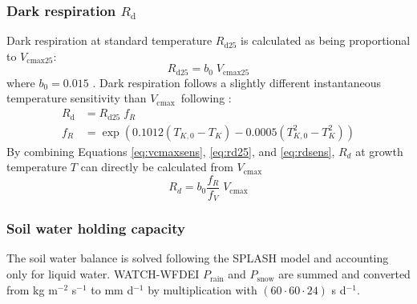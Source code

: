 \documentclass{myreport}
\newcommand{\vcmax}{$V_{\text{cmax}}$}
\begin{document}
\subsubsection{Dark respiration $R_{\mathrm{d}}$}

Dark respiration at standard temperature $R_{\mathrm{d25}}$ is calculated as being proportional to $V_{\mathrm{cmax25}}$:
\begin{equation}
\label{eq:rd25}
    R_{\mathrm{d25}} = b_0 \; V_{\mathrm{cmax25}}
\end{equation}
where $b_0 = 0.015$ \citep{atkin15}. Dark respiration follows a slightly different instantaneous temperature sensitivity than \vcmax\ following \cite{heskel16}:
\begin{align}
\label{eq:rdsens}
    R_{\mathrm{d}} &=  R_{\mathrm{d25}}\; f_R  \\
    f_R &= \exp \left(  0.1012(T_{K,0}-T_K) - 0.0005(T_{K,0}^2-T_K^2) \right) 
\end{align}
By combining Equations \ref{eq:vcmaxsens}, \ref{eq:rd25}, and \ref{eq:rdsens}, $R_d$ at growth temperature $T$ can directly be calculated from $V_{\mathrm{cmax}}$
\begin{equation}
    R_d = b_0 \frac{f_R}{f_V}\;V_{\mathrm{cmax}}
\end{equation}





\subsubsection{Soil water holding capacity}

The soil water balance is solved following the SPLASH model and accounting only for liquid water. WATCH-WFDEI $P_{\text{rain}}$ and $P_{\text{snow}}$ are summed and converted from kg m$^{-2}$ s$^{-1}$ to mm d$^{-1}$ by multiplication with $(60 \cdot 60 \cdot 24)$ s d$^{-1}$. 



\end{document}
